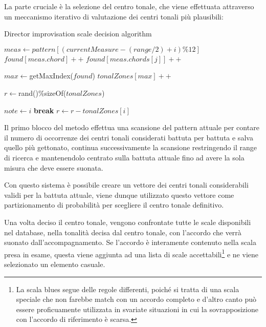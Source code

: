 La parte cruciale è la selezione del centro tonale, che viene effettuata attraverso un meccanismo iterativo di valutazione dei centri tonali più plausibili:

\begin{algorithm}[H]
\caption{Director improvisation scale decision algorithm}
\label{algo-director-tzone}
\begin{algorithmic}[1]
			\State $meas \gets pattern[(currentMeasure - (range/2) + i) \% 12]$
				\State $found[meas.chord] ++$
			\Else
				 	\State $found[meas.chords[j]] ++$
				\EndFor
			\EndIf
		\EndFor
		
		\State $max \gets $getMaxIndex($found$)
		\State $tonalZones[max] ++$
		
	\EndFor
	
	\State $r \gets $rand()$ \% $sizeOf($tonalZones$)
	
				\State $note \gets i$
				\State \textbf{break}
			\Else
				\State $r \gets r - tonalZones[i]$
			\EndIf
		\EndIf
	\EndFor
\EndFunction
\end{algorithmic}
\end{algorithm}

Il primo blocco del metodo effettua una scansione del pattern attuale per contare il numero di occorrenze dei centri tonali considerati battuta per battuta e salva quello più gettonato, continua successivamente la scansione restringendo il range di ricerca e mantenendolo centrato sulla battuta attuale fino ad avere la sola misura che deve essere suonata.

Con questo sistema è possibile creare un vettore dei centri tonali considerabili validi per la battuta attuale, viene dunque utilizzato questo vettore come partizionamento di probabilità per scegliere il centro tonale definitivo.

Una volta deciso il centro tonale, vengono confrontate tutte le scale disponibili nel database, nella tonalità decisa dal centro tonale, con l'accordo che verrà suonato dall'accompagnamento. Se l'accordo è interamente contenuto nella scala presa in esame, questa viene aggiunta ad una lista di scale accettabili\footnote{La scala blues segue delle regole differenti, poiché si tratta di una scala speciale che non farebbe match con un accordo completo e d'altro canto può essere proficuamente utilizzata in svariate situazioni in cui la sovrapposizione con l'accordo di riferimento è scarsa.} e ne viene selezionato un elemento casuale.

